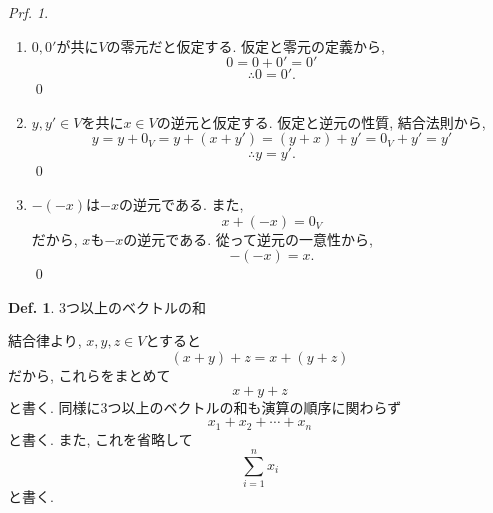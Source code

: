 \documentclass[a4paper,10pt,report]{amsart}
\theoremstyle{plain}
\theoremstyle{definition}
\newtheorem{defn}{Def.}[section]
\theoremstyle{remark}
\newtheorem{prf}{Prf.}
\begin{document}
\begin{prf}
    \begin{enumerate}
        \item \(0,0'\)が共に\(V\)の零元だと仮定する. 
        仮定と零元の定義から,
        \begin{equation*}
            0=0+0'=0'
        \end{equation*}
        \begin{equation*}
            \therefore 0=0'.
        \end{equation*}
        \qed{}
        \item \(y,y'\in V\)を共に\(x\in V\)の逆元と仮定する. 
        仮定と逆元の性質, 結合法則から, 
        \begin{equation*}
            y=y+0_{V}=y+(x+y')=(y+x)+y'=0_{V}+y'=y'
        \end{equation*}
        \begin{equation*}
            \therefore y=y'.
        \end{equation*}
        \qed{}
        \item \(-(-x)\)は\(-x\)の逆元である. また, 
        \begin{equation*}
            x+(-x)=0_{V}
        \end{equation*}
        だから, \(x\)も\(-x\)の逆元である. 從って逆元の一意性から,
        \begin{equation*}
            -(-x)=x.
        \end{equation*}
        \qed{}
    \end{enumerate}
\end{prf}
\begin{leftbar}
    \begin{defn}3つ以上のベクトルの和\par
        結合律より, \(x,y,z\in V\)とすると
        \begin{equation*}
            (x+y)+z=x+(y+z)
        \end{equation*}
        だから, これらをまとめて
        \begin{equation}
            x+y+z
        \end{equation}
        と書く. 同様に3つ以上のベクトルの和も演算の順序に関わらず
        \begin{equation}
            x_{1}+x_{2}+\cdots+x_{n}
        \end{equation}
        と書く. また, これを省略して
        \begin{equation}
            \sum_{i=1}^{n}x_{i}
        \end{equation}
        と書く. 
    \end{defn}
\end{leftbar}
\end{document}
